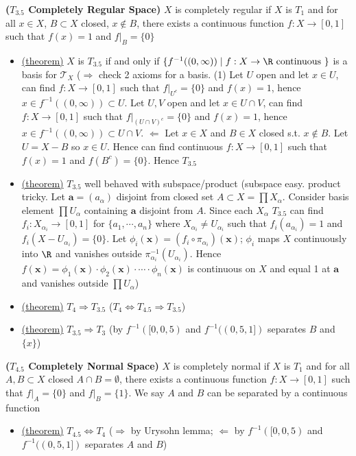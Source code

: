 \documentclass[10.5pt]{article}
\newcommand{\calT}{\mathcal{T}}
\newcommand{\ba}{\mathbf{a}}
\newcommand{\bx}{\mathbf{x}}
\begin{document}
\begin{defn*}
    \textbf{($T_{3.5}$ Completely Regular Space)} $X$ is completely regular if $X$ is $T_1$ and for all $x\in X$, $B\subset X$ closed, $x\not\in B$, there exists a continuous function $f:X\to [0,1]$ such that $f(x)=1$ and $f|_B = \{0\}$
    \begin{itemize}
        \item \underline{(theorem)} $X$ is $T_{3.5}$ if and only if $\{ f^{-1}((0, \infty)) \mid f:X\to \R \text{ continuous } \}$ is a basis for $\calT_X$ ($\Rightarrow$ check 2 axioms for a basis. (1) Let $U$ open and let $x\in U$, can find $f:X\to [0,1]$ such that $f|_{U^c} = \{0\}$ and $f(x)=1$, hence $x\in f^{-1}((0, \infty)) \subset U$. Let $U,V$ open and let $x\in U\cap V$, can find $f:X\to [0,1]$ such that $f|_{(U\cap V)^c} = \{0\}$ and $f(x)=1$, hence $x\in f^{-1}((0, \infty)) \subset U\cap V$. $\Leftarrow$ Let $x\in X$ and $B\in X$ closed s.t. $x\not\in B$. Let $U=X-B$ so $x\in U$. Hence can find continuous $f:X\to [0,1]$ such that $f(x) = 1$ and $f(B^c) = \{0\}$. Hence $T_{3.5}$
        \item \underline{(theorem)} $T_{3.5}$ well behaved with subspace/product (subspace easy. product tricky. Let $\ba=(a_{\alpha})$ disjoint from closed set $A\subset X = \textstyle \prod X_{\alpha}$. Consider basis element $\textstyle \prod U_{\alpha}$ containing $\ba$ disjoint from $A$. Since each $X_{\alpha}$ $T_{3.5}$ can find $f_i: X_{\alpha_i} \to [0,1]$ for $\{a_1, \cdots, a_n\}$ where $X_{\alpha_i} \neq U_{\alpha_i}$ such that $f_i(a_{\alpha_i}) = 1$ and $f_i(X-U_{\alpha_i}) = \{0\}$. Let $\phi_i(\bx) = (f_i \circ \pi_{\alpha_i} )(\bx)$; $\phi_i$ maps $X$ continuously into $\R$ and vanishes outside $\pi_{\alpha_i}^{-1}(U_{\alpha_i})$. Hence $f(\bx) = \phi_1(\bx) \cdot \phi_2(\bx) \cdot \cdots \cdot \phi_n(\bx)$ is continuous on $X$ and equal 1 at $\ba$ and vanishes outside $\textstyle \prod U_{\alpha}$)
        \item \underline{(theorem)} $T_4 \Rightarrow T_{3.5}$ ($T_{4} \iff T_{4.5} \Rightarrow T_{3.5}$)
        \item \underline{(theorem)} $T_{3.5} \Rightarrow T_3$ (by $f^{-1}([0, 0,5)$ and $f^{-1}((0,5, 1])$ separates $B$ and $\{x\}$)
    \end{itemize}
\end{defn*}

\begin{defn*}
    \textbf{($T_{4.5}$ Completely Normal Space)} $X$ is completely normal if $X$ is $T_1$ and for all $A,B\subset X$ closed $A\cap B=\emptyset$, there exists a continuous function $f:X\to [0,1]$ such that $f|_A = \{0\}$ and $f|_B= \{1\}$. We say $A$ and $B$ can be separated by a continuous function
    \begin{itemize}
        \item \underline{(theorem)} $T_{4.5} \iff T_4$ ($\Rightarrow$ by Urysohn lemma; $\Leftarrow$ by $f^{-1}([0, 0,5)$ and $f^{-1}((0,5, 1])$ separates $A$ and $B$)
    \end{itemize}
\end{defn*}
\end{document}
